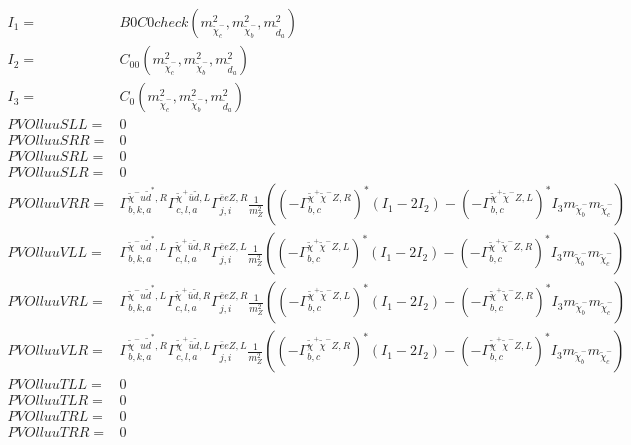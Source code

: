 \documentclass[A4,landscape]{article}
\begin{document}
\begin{align} 
I_1= & B0C0check(m^2_{\tilde{\chi}^-_{{c}}}, m^2_{\tilde{\chi}^-_{{b}}}, m^2_{\tilde{d}_{{a}}}) \\ 
I_2= & C_{00}(m^2_{\tilde{\chi}^-_{{c}}}, m^2_{\tilde{\chi}^-_{{b}}}, m^2_{\tilde{d}_{{a}}}) \\ 
I_3= & C_0(m^2_{\tilde{\chi}^-_{{c}}}, m^2_{\tilde{\chi}^-_{{b}}}, m^2_{\tilde{d}_{{a}}}) \\ 
  PVOlluuSLL= & 0 \\ 
  PVOlluuSRR= & 0 \\ 
  PVOlluuSRL= & 0 \\ 
  PVOlluuSLR= & 0 \\ 
  PVOlluuVRR= &  \Gamma^{\tilde{\chi}^- u \tilde{d}^*,R}_{b, k, a} \Gamma^{\tilde{\chi}^+\bar{u}\tilde{d} ,L}_{c, l, a} \Gamma^{\bar{e}e Z ,R}_{j, i} \frac{1}{m^2_{Z}} ((- \Gamma^{\tilde{\chi}^+\tilde{\chi}^- Z ,R} _{b, c})^* (I_1 - 2 I_2) - (- \Gamma^{\tilde{\chi}^+\tilde{\chi}^- Z ,L} _{b, c})^* I_3 m_{\tilde{\chi}^-_{{b}}} m_{\tilde{\chi}^-_{{c}}}) \\ 
  PVOlluuVLL= &  \Gamma^{\tilde{\chi}^- u \tilde{d}^*,L}_{b, k, a} \Gamma^{\tilde{\chi}^+\bar{u}\tilde{d} ,R}_{c, l, a} \Gamma^{\bar{e}e Z ,L}_{j, i} \frac{1}{m^2_{Z}} ((- \Gamma^{\tilde{\chi}^+\tilde{\chi}^- Z ,L} _{b, c})^* (I_1 - 2 I_2) - (- \Gamma^{\tilde{\chi}^+\tilde{\chi}^- Z ,R} _{b, c})^* I_3 m_{\tilde{\chi}^-_{{b}}} m_{\tilde{\chi}^-_{{c}}}) \\ 
  PVOlluuVRL= &  \Gamma^{\tilde{\chi}^- u \tilde{d}^*,L}_{b, k, a} \Gamma^{\tilde{\chi}^+\bar{u}\tilde{d} ,R}_{c, l, a} \Gamma^{\bar{e}e Z ,R}_{j, i} \frac{1}{m^2_{Z}} ((- \Gamma^{\tilde{\chi}^+\tilde{\chi}^- Z ,L} _{b, c})^* (I_1 - 2 I_2) - (- \Gamma^{\tilde{\chi}^+\tilde{\chi}^- Z ,R} _{b, c})^* I_3 m_{\tilde{\chi}^-_{{b}}} m_{\tilde{\chi}^-_{{c}}}) \\ 
  PVOlluuVLR= &  \Gamma^{\tilde{\chi}^- u \tilde{d}^*,R}_{b, k, a} \Gamma^{\tilde{\chi}^+\bar{u}\tilde{d} ,L}_{c, l, a} \Gamma^{\bar{e}e Z ,L}_{j, i} \frac{1}{m^2_{Z}} ((- \Gamma^{\tilde{\chi}^+\tilde{\chi}^- Z ,R} _{b, c})^* (I_1 - 2 I_2) - (- \Gamma^{\tilde{\chi}^+\tilde{\chi}^- Z ,L} _{b, c})^* I_3 m_{\tilde{\chi}^-_{{b}}} m_{\tilde{\chi}^-_{{c}}}) \\ 
  PVOlluuTLL= & 0 \\ 
  PVOlluuTLR= & 0 \\ 
  PVOlluuTRL= & 0 \\ 
  PVOlluuTRR= & 0 \\ 
\end{align} 
\end{document}
